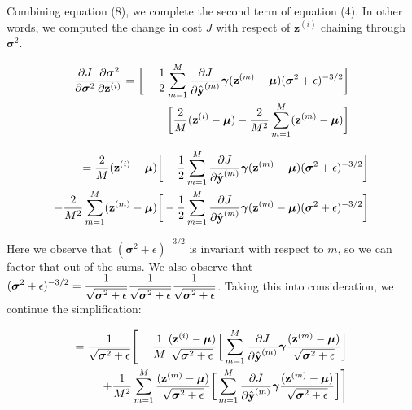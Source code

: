 \documentclass{article}
\begin{document}
\begin{multicols}{2}
Combining equation (8), we complete the second term of equation (4).
In other words, we computed the change in cost $J$ with respect of 
$\textbf{z}^{(i)}$ chaining through $\boldsymbol{\sigma}^2$.

$$
\begin{aligned}
    {\partial J \over \partial \boldsymbol{\sigma}^2} 
    {\partial \boldsymbol{\sigma}^2 \over \partial \textbf{z}^{(i)}} = 
    \bigg[
    -{1\over 2}
    \sum_{m = 1}^M {\partial J \over \partial \hat{\textbf{y}}^{(m)}} 
    \boldsymbol{\gamma}
    (\textbf{z}^{(m)} - \boldsymbol{\mu}) (\boldsymbol{\sigma}^2 + \epsilon)^{-3/2} \bigg]\\
    \bigg[{2 \over M} (\textbf{z}^{(i)} - \boldsymbol{\mu})
    -{2 \over M^2} \sum_{m=1}^M (\textbf{z}^{(m)} - \boldsymbol{\mu})\bigg]
\end{aligned}
$$
    
$$ \begin{aligned}
    = {2 \over M} (\textbf{z}^{(i)} - \boldsymbol{\mu}) \bigg[
    -{1\over 2}
    \sum_{m = 1}^M {\partial J \over \partial \hat{\textbf{y}}^{(m)}} 
    \boldsymbol{\gamma}
    (\textbf{z}^{(m)} - \boldsymbol{\mu}) (\boldsymbol{\sigma}^2 + \epsilon)^{-3/2} \bigg]\\
    -{2 \over M^2} \sum_{m=1}^M (\textbf{z}^{(m)} - \boldsymbol{\mu})
    \bigg[
    -{1\over 2}
    \sum_{m = 1}^M {\partial J \over \partial \hat{\textbf{y}}^{(m)}} 
    \boldsymbol{\gamma}
    (\textbf{z}^{(m)} - \boldsymbol{\mu}) (\boldsymbol{\sigma}^2 + \epsilon)^{-3/2} \bigg]
\end{aligned}$$

Here we observe that $(\boldsymbol{\sigma}^2 + \epsilon)^{-3/2}$ is invariant 
with respect to $m$, so we can factor that out of the sums. We also observe
that $\begin{aligned}
    (\boldsymbol{\sigma}^2 + \epsilon)^{-3/2} = 
    {1\over \sqrt{\boldsymbol{\sigma}^2 + \epsilon}}
    {1\over \sqrt{\boldsymbol{\sigma}^2 + \epsilon}}
    {1\over \sqrt{\boldsymbol{\sigma}^2 + \epsilon}}
\end{aligned}$. Taking this into consideration, we continue the simplification:

$$\begin{aligned}
    = {1 \over \sqrt{\boldsymbol{\sigma}^2 + \epsilon}}\Bigg[-{1 \over M} {(\textbf{z}^{(i)} - \boldsymbol{\mu})\over \sqrt{\boldsymbol{\sigma}^2 + \epsilon}} \bigg[
        \sum_{m = 1}^M {\partial J \over \partial \hat{\textbf{y}}^{(m)}} 
        \boldsymbol{\gamma}
        {(\textbf{z}^{(m)} - \boldsymbol{\mu})\over \sqrt{\boldsymbol{\sigma}^2 + \epsilon}} \bigg]\\
        +{1 \over M^2} \sum_{m=1}^M {(\textbf{z}^{(m)} - \boldsymbol{\mu})\over \sqrt{\boldsymbol{\sigma}^2 + \epsilon}}
        \bigg[
        \sum_{m = 1}^M {\partial J \over \partial \hat{\textbf{y}}^{(m)}} 
        \boldsymbol{\gamma}
        {(\textbf{z}^{(m)} - \boldsymbol{\mu})\over \sqrt{\boldsymbol{\sigma}^2 + \epsilon}}\bigg]\Bigg]
\end{aligned}$$


\end{multicols}
\end{document}
